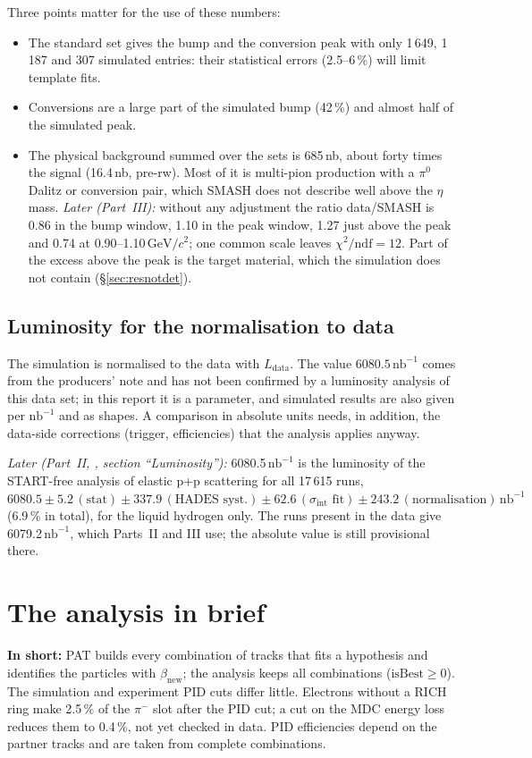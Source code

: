 \documentclass[11pt,a4paper]{article}
\newcommand{\pim}{\ensuremath{\pi^{-}}\xspace}
\newcommand{\piz}{\ensuremath{\pi^{0}}\xspace}
\newcommand{\betanew}{\ensuremath{\beta_{\mathrm{new}}}\xspace}
\newcommand{\nbinv}{\ensuremath{\mathrm{nb}^{-1}}\xspace}
\newcommand{\GeVcc}{\ensuremath{\mathrm{GeV}/c^{2}}\xspace}
\newcommand{\Ldata}{\ensuremath{L_{\mathrm{data}}}\xspace}
\newcommand{\code}[1]{\texttt{\detokenize{#1}}}
\newcommand{\inshort}[1]{\par\noindent\colorbox{black!5}{\parbox{\dimexpr\linewidth-2\fboxsep\relax}{\textbf{In short:} #1}}\par}
\begin{document}
Three points matter for the use of these numbers:
\begin{itemize}
\item The standard set gives the bump and the conversion peak with only 1\,649, 1\,187 and
      307 simulated entries: their statistical errors (2.5--6\,\%) will limit template fits.
\item Conversions are a large part of the simulated bump (42\,\%) and almost half of the
      simulated peak.
\item The physical background summed over the sets is 685\,nb, about forty times the signal
      (16.4\,nb, pre-rw).
      Most of it is multi-pion production with a \piz Dalitz or conversion pair, which SMASH
      does not describe well above the $\eta$ mass. \emph{Later (Part~III):} without any adjustment the ratio
      data/SMASH is 0.86 in the bump window, 1.10 in the peak window, 1.27 just above the peak and 0.74 at
      0.90--1.10\,\GeVcc; one common scale leaves $\chi^2/\mathrm{ndf}=12$. Part of the excess above the peak is the
      target material, which the simulation does not contain (\S\ref{sec:resnotdet}).
\end{itemize}

\subsection{Luminosity for the normalisation to data}
\label{sec:lumi}
The simulation is normalised to the data with $\Ldata$. The value $6080.5\,\nbinv$ comes
from the producers' note and has not been confirmed by a luminosity analysis of this data
set; in this report it is a parameter, and simulated results are also given per \nbinv and
as shapes. A comparison in absolute units needs, in addition, the data-side corrections
(trigger, efficiencies) that the analysis applies anyway.

\emph{Later (Part~II, \code{report_exp.pdf}, section ``Luminosity''):} 6080.5\,\nbinv is the luminosity of the
START-free analysis of elastic p+p scattering for all 17\,615 runs, $6080.5\pm5.2\,(\mathrm{stat})\pm337.9\,(\text{HADES
syst.})\pm62.6\,(\sigma_{\mathrm{int}}\text{ fit})\pm243.2\,(\text{normalisation})\,\nbinv$ (6.9\,\% in total), for the
liquid hydrogen only. The runs present in the data give 6079.2\,\nbinv, which Parts~II and III use; the absolute value is
still provisional there.

\section{The analysis in brief}
\label{sec:ana}
\inshort{PAT builds every combination of tracks that fits a hypothesis and identifies the particles with $\betanew$;
the analysis keeps all combinations ($\mathrm{isBest}\ge0$). The simulation and experiment PID cuts differ little.
Electrons without a RICH ring make 2.5\,\% of the \pim slot after the PID cut; a cut on the MDC energy loss reduces
them to 0.4\,\%, not yet checked in data. PID efficiencies depend on the partner tracks and are taken from complete
combinations.}
\end{document}
